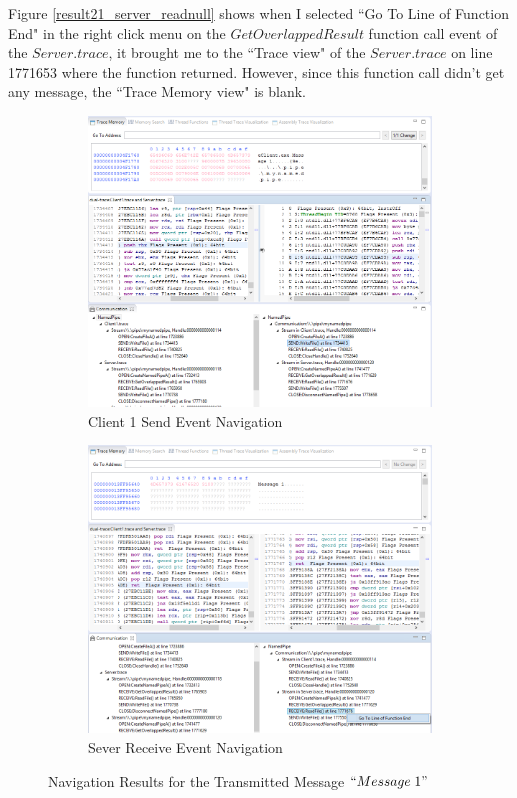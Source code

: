 Figure \ref{result21_server_readnull} shows when I selected ``Go To Line of Function End" in the right click menu on the $GetOverlappedResult$ function call event of the $Server.trace$, it brought me to the ``Trace view" of the $Server.trace$ on line 1771653 where the function returned. However, since this function call didn't get any message, the ``Trace Memory view" is blank.


\begin{figure}[H]
\begin{subfigure}[H]{0.45\linewidth}
\includegraphics[scale=0.35]{Figures/result21_client_send}
 \caption{Client 1 Send Event Navigation}
\label{result21_client_send}
\end{subfigure}
\hfill
\begin{subfigure}[H]{0.45\linewidth}
\includegraphics[scale=0.35]{Figures/result21_server_read}
 \caption{Sever Receive Event Navigation}
\label{result21_server_read}
\end{subfigure}%
\caption{Navigation Results for the Transmitted Message $``Message\; 1"$}
\label{result21_client_to_server}
\end{figure}

